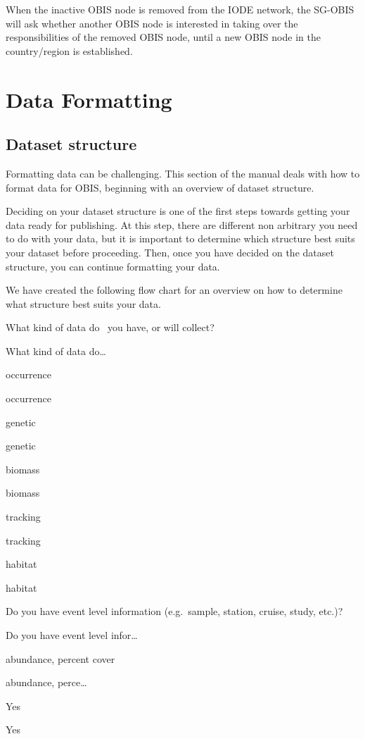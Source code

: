 \documentclass[
  letterpaper,
  DIV=11,
  numbers=noendperiod,
  oneside]{scrreprt}
\begin{document}
When the inactive OBIS node is removed from the IODE network, the
SG-OBIS will ask whether another OBIS node is interested in taking over
the responsibilities of the removed OBIS node, until a new OBIS node in
the country/region is established.

\part{Data Formatting}

\hypertarget{dataset-structure}{%
\chapter{Dataset structure}\label{dataset-structure}}

Formatting data can be challenging. This section of the manual deals
with how to format data for OBIS, beginning with an overview of dataset
structure.

Deciding on your dataset structure is one of the first steps towards
getting your data ready for publishing. At this step, there are
different non arbitrary you need to do with your data, but it is
important to determine which structure best suits your dataset before
proceeding. Then, once you have decided on the dataset structure, you
can continue formatting your data.

We have created the following flow chart for an overview on how to
determine what structure best suits your data.

What kind of data do~ you have, or will collect?

What kind of data do\ldots{}

occurrence

occurrence

genetic

genetic

biomass

biomass

tracking

tracking

habitat

habitat

Do you have event level information (e.g.~sample, station, cruise,
study, etc.)?

Do you have event level infor\ldots{}

abundance, percent cover

abundance, perce\ldots{}

Yes

Yes
\end{document}
